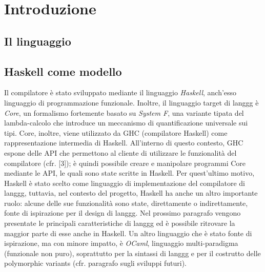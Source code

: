 \documentclass[10pt,a4paper]{article}
\begin{document}
\textwidth=450pt\oddsidemargin=0pt

\section{Introduzione}

\subsection{Il linguaggio}

\subsection{Haskell come modello}
Il compilatore è stato sviluppato mediante il linguaggio \textit{Haskell}, anch'esso linguaggio di programmazione funzionale.
Inoltre, il linguaggio target di langgg è \textit{Core}, un formalismo fortemente basato su \textit{System F}, una
variante tipata del lambda-calcolo che introduce un meccanismo di quantificazione universale sui tipi. Core, inoltre,
viene utilizzato da GHC (compilatore Haskell) come rappresentazione intermedia di Haskell. All'interno di questo
contesto, GHC espone delle API che permettono al cliente di utilizzare le funzionalità del compilatore (cfr. [3]); è quindi
possibile creare e manipolare programmi Core mediante le API, le quali sono state scritte in Haskell. Per quest'ultimo
motivo, Haskell è stato scelto come linguaggio di implementazione del compilatore di langgg, tuttavia, nel contesto
del progetto, Haskell ha anche un altro importante ruolo: alcune delle sue funzionalità sono state, direttamente
o indirettamente, fonte di ispirazione per il design di langgg. Nel prossimo paragrafo vengono presentate le principali
caratteristiche di langgg ed è possibile ritrovare la maggior parte di esse anche in Haskell. Un altro linguaggio
che è stato fonte di ispirazione, ma con minore impatto, è \textit{OCaml}, linguaggio multi-paradigma (funzionale non
puro), soprattutto per la sintassi di langgg e per il costrutto delle polymorphic variants (cfr. paragrafo sugli
sviluppi futuri).
\end{document}
